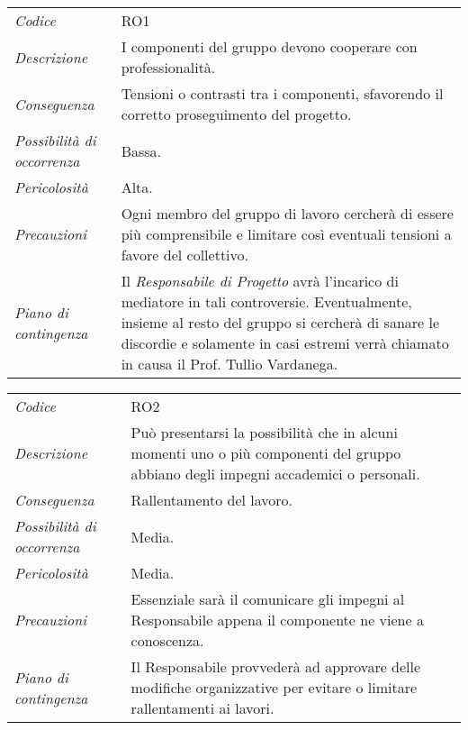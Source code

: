 {{{{{	\begin{center}
		\renewcommand{\arraystretch}{1.4}
		\begin{longtable}{|p{5cm}|p{12cm}|}
			\hline
			\rowcolor{airforceblue}
			\multicolumn{2}{|c|}{\textit{Contrasti tra i componenti}}\\
			\hline
			\textit{Codice} & RO1 \\
			\hline
			\textit{Descrizione} & I componenti del gruppo devono cooperare con professionalità. \\
			\hline
			\textit{Conseguenza} & Tensioni o contrasti tra i componenti, sfavorendo il corretto proseguimento del progetto. \\
			\hline
			\textit{Possibilità di occorrenza} & Bassa. \\
			\hline
			\textit{Pericolosità} & Alta. \\
			\hline
			\textit{Precauzioni} & Ogni membro del gruppo di lavoro cercherà di essere più comprensibile e limitare così eventuali tensioni a favore del collettivo. \\
			\hline
			\textit{Piano di contingenza} & Il \textit{Responsabile di Progetto} avrà l'incarico di mediatore in tali controversie.
			Eventualmente, insieme al resto del gruppo si cercherà di sanare le discordie e solamente in casi estremi verrà chiamato in causa il Prof. Tullio Vardanega.  \\
			\hline
		\end{longtable}
	\end{center}


\def\tabularxcolumn#1{m{#1}}
{

	\begin{center}
		\renewcommand{\arraystretch}{1.4}
		\begin{longtable}{|p{5cm}|p{12cm}|}
			\hline
			\rowcolor{airforceblue}
			\multicolumn{2}{|c|}{\textit{Impegni personali}}\\
			\hline
			\textit{Codice} & RO2 \\
			\hline
			\textit{Descrizione} & Può presentarsi la possibilità che in alcuni momenti uno o più componenti del gruppo abbiano degli impegni accademici o personali. \\
			\hline
			\textit{Conseguenza} & Rallentamento del lavoro.\\
			\hline
			\textit{Possibilità di occorrenza} & Media. \\
			\hline
			\textit{Pericolosità} & Media. \\
			\hline
			\textit{Precauzioni} & Essenziale sarà il comunicare gli impegni al Responsabile appena il componente ne viene a conoscenza. \\
			\hline
			\textit{Piano di contingenza} & Il Responsabile provvederà ad approvare delle modifiche organizzative per evitare o limitare rallentamenti ai lavori. \\
			\hline
		\end{longtable}
	\end{center}

}}}}}}

